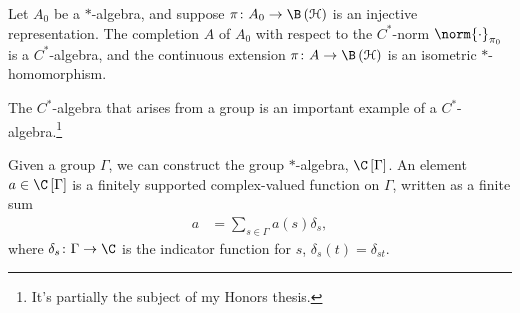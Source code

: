 \documentclass[10pt]{mypackage}
\begin{document}
\begin{corollary}
  Let $A_0$ be a $\ast$-algebra, and suppose $\pi\colon A_0\rightarrow \B\left(\mathcal{H}\right)$ is an injective representation. The completion $A$ of $A_0$ with respect to the $C^{\ast}$-norm $\norm{\cdot}_{\pi_0}$ is a $C^{\ast}$-algebra, and the continuous extension $\pi\colon A\rightarrow \B\left(\mathcal{H}\right)$ is an isometric $\ast$-homomorphism.
\end{corollary}
The $C^{\ast}$-algebra that arises from a group is an important example of a $C^{\ast}$-algebra.\footnote{It's partially the subject of my Honors thesis.}\newline

Given a group $\Gamma$, we can construct the group $\ast$-algebra, $\C\left[\Gamma\right]$. An element $a\in \C\left[\Gamma\right]$ is a finitely supported complex-valued function on $\Gamma$, written as a finite sum
\begin{align*}
  a &= \sum_{s\in\Gamma}a(s)\delta_s,
\end{align*}
where $\delta_s\colon \Gamma\rightarrow \C$ is the indicator function for $s$, $\delta_s\left(t\right) = \delta_{st}$.\newline
\end{document}
